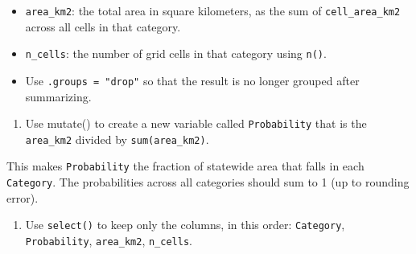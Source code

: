 \documentclass[
  12pt,
]{scrreprt}
\providecommand{\tightlist}{%
  \setlength{\itemsep}{0pt}\setlength{\parskip}{0pt}}
\begin{document}
\begin{itemize}
\item
  \texttt{area\_km2}: the total area in square kilometers, as the sum of \texttt{cell\_area\_km2} across all cells in that category.
\item
  \texttt{n\_cells}: the number of grid cells in that category using \texttt{n()}.
\item
  Use \texttt{.groups\ =\ "drop"} so that the result is no longer grouped after summarizing.
\end{itemize}

\begin{enumerate}
\def\labelenumi{\arabic{enumi}.}
\setcounter{enumi}{3}
\tightlist
\item
  Use mutate() to create a new variable called \texttt{Probability} that is the \texttt{area\_km2} divided by \texttt{sum(area\_km2)}.
\end{enumerate}

This makes \texttt{Probability} the fraction of statewide area that falls in each \texttt{Category}. The probabilities across all categories should sum to 1 (up to rounding error).

\begin{enumerate}
\def\labelenumi{\arabic{enumi}.}
\setcounter{enumi}{4}
\tightlist
\item
  Use \texttt{select()} to keep only the columns, in this order:
  \texttt{Category}, \texttt{Probability}, \texttt{area\_km2}, \texttt{n\_cells}.
\end{enumerate}
\end{document}
